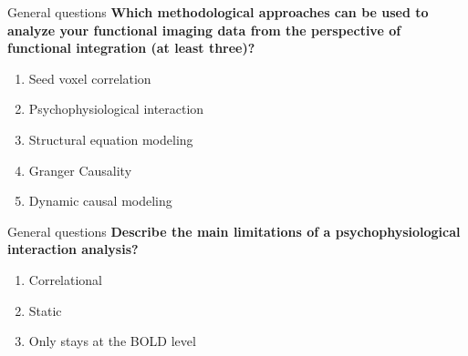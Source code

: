 \documentclass{beamer}
\begin{document}
\begin{frame}{General questions}
\textbf{Which methodological approaches can be used to analyze your functional imaging data from the perspective of functional integration (at least three)?}

\smallskip
  \begin{enumerate}
    \item Seed voxel correlation
    \item Psychophysiological interaction
    \item Structural equation modeling
    \item Granger Causality
    \item Dynamic causal modeling
  \end{enumerate}  
\end{frame}


\begin{frame}{General questions}
\textbf{Describe the main limitations of a psychophysiological interaction analysis?}

\smallskip
  \begin{enumerate}
    \item Correlational
    \item Static
    \item Only stays at the BOLD level
  \end{enumerate}
\end{frame}

\end{document}
